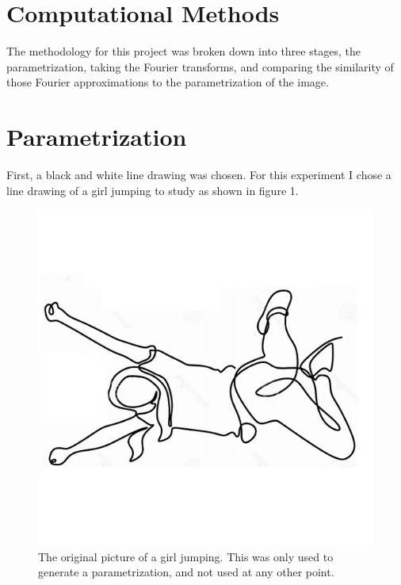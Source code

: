 \documentclass[psamsfonts]{amsart}
\theoremstyle{definition}
\theoremstyle{remark}
\numberwithin{equation}{section}
\begin{document}
\section{Computational Methods}
The methodology for this project was broken down into three stages, the parametrization, taking the Fourier transforms, and comparing the similarity of those Fourier approximations to the parametrization of the image. 

\section{Parametrization}
First, a black and white line drawing was chosen. For this experiment I chose a line drawing of a girl jumping to study as shown in figure 1.

\begin{figure}[h!]
	\centering
	\includegraphics[scale=.75]{girl.jpg}
	\caption{The original picture of a girl jumping. This was only used to generate a parametrization, and not used at any other point.}
\end{figure}
\end{document}

